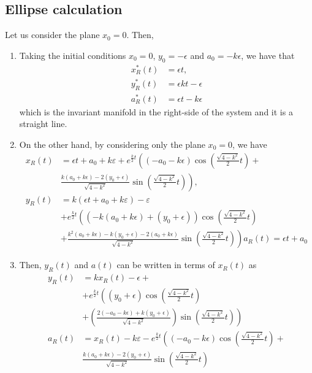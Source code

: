 \documentclass[a4paper,preprint,11pt]{article}
\begin{document}
\subsection{Ellipse calculation}
Let us consider the plane $x_0=0$. Then,
\begin{enumerate}
    \item Taking the initial conditions $x_0=0$, $y_0=-\epsilon$ and $a_0=-k\epsilon$, we have that
\begin{align*}
x^*_R(t)&=\epsilon t,\\
y^*_R(t)&=\epsilon kt-\epsilon\\
a^*_R(t)&=\epsilon t-k\epsilon
\end{align*}
which is the invariant manifold in the right-side of the system and it is a straight line.
\item On the other hand, by considering only the plane  $x_0=0$, we have
\begin{align*}
x_R(t)&=\epsilon t + a_0 +k\varepsilon+
  e^{\frac {k}{2}t} \left(
      (-a_0-k\epsilon) \cos\left(\frac {\sqrt{4-k^2}}2t \right)+\right. \\
      & \left. \frac{k(a_0+k\epsilon)-2(y_0+\epsilon)}{\sqrt{4-k^2}} \sin\left(\frac {\sqrt{4-k^2}}2t \right)
    \right),\\
y_R(t)&=k(\epsilon t + a_0 +k\varepsilon)-\varepsilon\\
  &+e^{\frac {k}{2}t} \left(
      (-k(a_0+k\epsilon)+(y_0+\epsilon))\cos\left(\frac {\sqrt{4-k^2}}2t \right) \right. \\
      &  \left. +\frac{k^2(a_0+k\epsilon)-k(y_0+\epsilon)-2(a_0+k\epsilon)}{\sqrt{4-k^2}} \sin\left(\frac {\sqrt{4-k^2}}2t \right)
    \right)
a_R(t)=\epsilon t + a_0
\end{align*}
\item Then, $y_R(t)$ and $a(t)$ can be written in terms of $x_R(t)$ as
\begin{align*}
y_R(t)&=k x_R(t) - \epsilon +\\
  &+e^{\frac {k}{2}t} \left(
      (y_0+\epsilon)\cos\left(\frac {\sqrt{4-k^2}}2t \right) \right. \\
      &  \left. +\left( \frac{2(-a_0-k\epsilon)+k(y_0+\epsilon)}{\sqrt{4-k^2}} \right) \sin\left(\frac {\sqrt{4-k^2}}2t \right)
    \right)\\
a_R(t)&=x_R(t)-k\varepsilon-
  e^{\frac {k}{2}t} \left(
      (-a_0-k\epsilon) \cos\left(\frac {\sqrt{4-k^2}}2t \right)+\right. \\
      & \left. \frac{k(a_0+k\epsilon)-2(y_0+\epsilon)}{\sqrt{4-k^2}} \sin\left(\frac {\sqrt{4-k^2}}2t \right)

\end{align*}
\end{enumerate}
\end{document}
